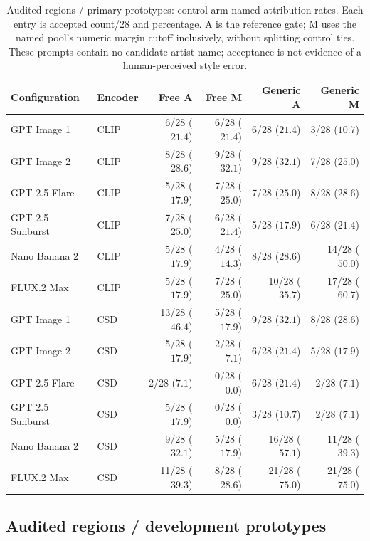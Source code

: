 \begin{table}[!htbp]
\caption{Audited regions / primary prototypes: control-arm named-attribution rates. Each entry is accepted count/28 and percentage. A is the reference gate; M uses the named pool's numeric margin cutoff inclusively, without splitting control ties. These prompts contain no candidate artist name; acceptance is not evidence of a human-perceived style error.}
\label{tab:selective-controls-audited-region-primary}
\centering\footnotesize\setlength{\tabcolsep}{3pt}
\begin{tabularx}{\linewidth}{@{}Xlrrrr@{}}\toprule
Configuration & Encoder & Free A & Free M & Generic A & Generic M\\\midrule
GPT Image 1 & CLIP & 6/28 ($21.4$) & 6/28 ($21.4$) & 6/28 ($21.4$) & 3/28 ($10.7$)\\
GPT Image 2 & CLIP & 8/28 ($28.6$) & 9/28 ($32.1$) & 9/28 ($32.1$) & 7/28 ($25.0$)\\
GPT 2.5 Flare & CLIP & 5/28 ($17.9$) & 7/28 ($25.0$) & 7/28 ($25.0$) & 8/28 ($28.6$)\\
GPT 2.5 Sunburst & CLIP & 7/28 ($25.0$) & 6/28 ($21.4$) & 5/28 ($17.9$) & 6/28 ($21.4$)\\
Nano Banana 2 & CLIP & 5/28 ($17.9$) & 4/28 ($14.3$) & 8/28 ($28.6$) & 14/28 ($50.0$)\\
FLUX.2 Max & CLIP & 5/28 ($17.9$) & 7/28 ($25.0$) & 10/28 ($35.7$) & 17/28 ($60.7$)\\
GPT Image 1 & CSD & 13/28 ($46.4$) & 5/28 ($17.9$) & 9/28 ($32.1$) & 8/28 ($28.6$)\\
GPT Image 2 & CSD & 5/28 ($17.9$) & 2/28 ($7.1$) & 6/28 ($21.4$) & 5/28 ($17.9$)\\
GPT 2.5 Flare & CSD & 2/28 ($7.1$) & 0/28 ($0.0$) & 6/28 ($21.4$) & 2/28 ($7.1$)\\
GPT 2.5 Sunburst & CSD & 5/28 ($17.9$) & 0/28 ($0.0$) & 3/28 ($10.7$) & 2/28 ($7.1$)\\
Nano Banana 2 & CSD & 9/28 ($32.1$) & 5/28 ($17.9$) & 16/28 ($57.1$) & 11/28 ($39.3$)\\
FLUX.2 Max & CSD & 11/28 ($39.3$) & 8/28 ($28.6$) & 21/28 ($75.0$) & 21/28 ($75.0$)\\
\bottomrule\end{tabularx}
\end{table}
\FloatBarrier
\clearpage\subsection{Audited regions / development prototypes}
